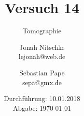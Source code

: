

\title{Versuch 14}
\subtitle{Tomographie}
\author{Jonah Nitschke\\
        lejonah@web.de \and
        Sebastian Pape\\
        sepa@gmx.de}
\date{Durchführung: 10.01.2018\\
      Abgabe: \today}



\maketitle
\newpage
\setcounter{page}{1}


\newpage

\newpage
\printbibliography


